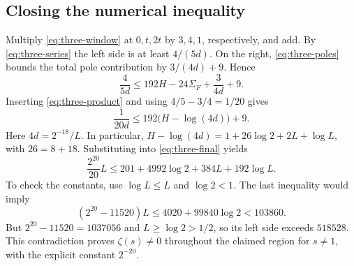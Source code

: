 \subsection{Closing the numerical inequality}

Multiply \eqref{eq:three-window} at \(0,t,2t\) by \(3,4,1\),
respectively, and add. By \eqref{eq:three-series} the left side is at
least \(4/(5d)\). On the right, \eqref{eq:three-poles} bounds the total
pole contribution by \(3/(4d)+9\). Hence
\[
 \frac{4}{5d}
 \le 192H-24\Sigma_F+\frac{3}{4d}+9 .
\]
Inserting \eqref{eq:three-product} and using
\(4/5-3/4=1/20\) gives
\begin{equation}
     \frac{1}{20d}\le 192\bigl(H-\log(4d)\bigr)+9 .
     \label{eq:three-final}
\end{equation}
Here \(4d=2^{-18}/L\). In particular,
\(H-\log(4d)=1+26\log 2+2L+\log L\), with \(26=8+18\).
Substituting into \eqref{eq:three-final} yields
\[
    \frac{2^{20}}{20}L
        \le 201+4992\log 2+384L+192\log L .
\]
To check the constants, use \(\log L\le L\) and \(\log 2<1\).
The last inequality would imply
\[
     (2^{20}-11520)L
       \le 4020+99840\log 2 < 103860 .
\]
But \(2^{20}-11520=1037056\) and \(L\ge\log 2>1/2\), so its left
side exceeds \(518528\). This contradiction proves
\(\zeta(s)\ne0\) throughout the claimed region for \(s\ne1\), with the
explicit constant \(2^{-20}\).

